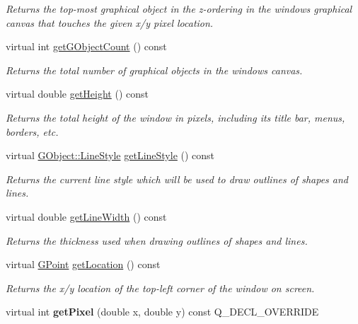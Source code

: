 \begin{DoxyCompactItemize}
\begin{DoxyCompactList}\small\item\em Returns the top-\/most graphical object in the z-\/ordering in the window\textquotesingle{}s graphical canvas that touches the given x/y pixel location. \end{DoxyCompactList}\item 
virtual int \mbox{\hyperlink{classGWindow_ad59694124f2cdd71af9c137094df4d1f}{get\+G\+Object\+Count}} () const
\begin{DoxyCompactList}\small\item\em Returns the total number of graphical objects in the window\textquotesingle{}s canvas. \end{DoxyCompactList}\item 
virtual double \mbox{\hyperlink{classGWindow_a1e7e353362434072875264cf95629f99}{get\+Height}} () const
\begin{DoxyCompactList}\small\item\em Returns the total height of the window in pixels, including its title bar, menus, borders, etc. \end{DoxyCompactList}\item 
virtual \mbox{\hyperlink{classGObject_a86e0f5648542856159bb40775c854aa7}{G\+Object\+::\+Line\+Style}} \mbox{\hyperlink{classGDrawingSurface_aaf1f5ea8281e5e3486662878d26f0a13}{get\+Line\+Style}} () const
\begin{DoxyCompactList}\small\item\em Returns the current line style which will be used to draw outlines of shapes and lines. \end{DoxyCompactList}\item 
virtual double \mbox{\hyperlink{classGDrawingSurface_a85ff266dc3eb63d9f2d8e5a4487fd3c0}{get\+Line\+Width}} () const
\begin{DoxyCompactList}\small\item\em Returns the thickness used when drawing outlines of shapes and lines. \end{DoxyCompactList}\item 
virtual \mbox{\hyperlink{classGPoint}{G\+Point}} \mbox{\hyperlink{classGWindow_a4f83802015511edeb63b892830812c11}{get\+Location}} () const
\begin{DoxyCompactList}\small\item\em Returns the x/y location of the top-\/left corner of the window on screen. \end{DoxyCompactList}\item 
virtual int {\bfseries get\+Pixel} (double x, double y) const Q\+\_\+\+D\+E\+C\+L\+\_\+\+O\+V\+E\+R\+R\+I\+DE

\end{DoxyCompactItemize}
